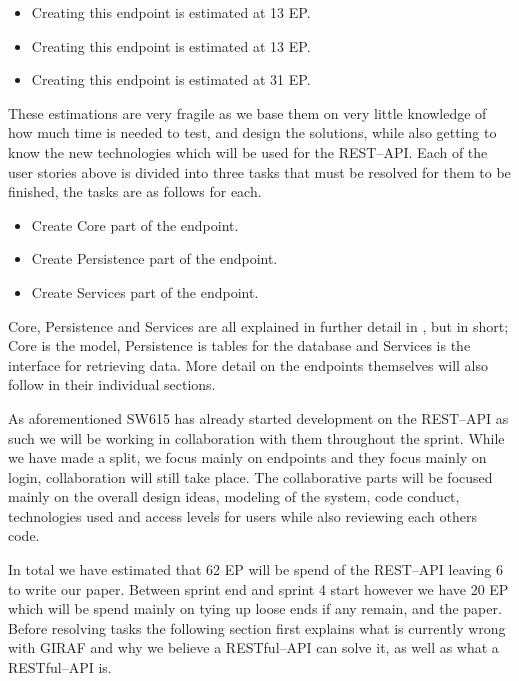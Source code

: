 \begin{itemize}[style=unboxed]
	\item {}
	Creating this endpoint is estimated at 13 EP.
	\item {}
	Creating this endpoint is estimated at 13 EP.
	\item {}
	Creating this endpoint is estimated at 31 EP.
\end{itemize}
These estimations are very fragile as we base them on very little knowledge of how much time is needed to test, and design the solutions, while also getting to know the new technologies which will be used for the REST--API.
Each of the user stories above is divided into three tasks that must be resolved for them to be finished, the tasks are as follows for each.
\begin{itemize}
    \item Create Core part of the endpoint.
    \item Create Persistence part of the endpoint.
    \item Create Services part of the endpoint.
\end{itemize}
Core, Persistence and Services are all explained in further detail in \myref{}, but in short; Core is the model, Persistence is tables for the database and Services is the interface for retrieving data.
More detail on the endpoints themselves will also follow in their individual sections.

As aforementioned SW615 has already started development on the REST--API as such we will be working in collaboration with them throughout the sprint.
While we have made a split, we focus mainly on endpoints and they focus mainly on login, collaboration will still take place.
The collaborative parts will be focused mainly on the overall design ideas, modeling of the system, code conduct, technologies used and access levels for users while also reviewing each others code.

In total we have estimated that 62 EP will be spend of the REST--API leaving 6 to write our paper.
Between sprint end and sprint 4 start however we have 20 EP which will be spend mainly on tying up loose ends if any remain, and the paper.
Before resolving tasks the following section first explains what is currently wrong with GIRAF and why we believe a RESTful--API can solve it, as well as what a RESTful--API is.
